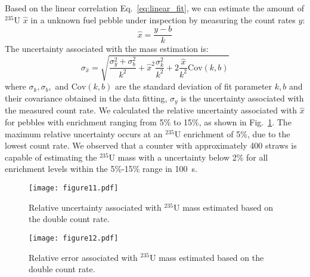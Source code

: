 \documentclass[preprint,final]{elsarticle}
\begin{document}
Based on the linear correlation Eq.~\ref{eq:linear_fit}, we can estimate the amount of $^{235}$U $\hat{x}$ in a unknown fuel pebble under inspection by measuring the  count rates $y$:
\begin{equation}
    \hat{x} = \frac{y-b}{k}
\end{equation}
The uncertainty associated with the mass estimation is:
\begin{equation}
    \sigma_{\hat{x}} = \sqrt{\frac{\sigma_y^2+\sigma_b^2}{k^2}+\hat{x}^2\frac{\sigma_k^2}{k^2}+2\frac{\hat{x}}{k^2}\mathrm{Cov}(k, b)}
\end{equation}
where $\sigma_k, \sigma_b, $ and $\mathrm{Cov}(k, b)$ are the standard deviation of fit parameter $k, b$ and their covariance obtained in the data fitting,  $\sigma_y$ is the uncertainty associated with the measured count rate\cite{difulvio}.
We calculated the relative uncertainty associated with $\hat{x}$ for pebbles with enrichment ranging from 5\% to 15\%, as shown in Fig.~\ref{fig:D_uncerainty}. The maximum relative uncertainty occurs at an ${}^{235}$U enrichment of 5\%, due to the lowest count rate. We observed that a counter with approximately 400 straws is capable of estimating the ${}^{235}$U mass with a uncertainty below 2\% for all enrichment levels within the 5\%-15\% range in \SI{100}{\second}.
\begin{figure}[!htbp]
    \centering
    \texttt{[image: figure11.pdf]}
    \caption{Relative uncertainty associated with $^{235}$U mass estimated based on the double count rate.}
    \label{fig:D_uncerainty}
\end{figure}
\begin{figure}[!htbp]
    \centering
    \texttt{[image: figure12.pdf]}
    \caption{Relative error associated with $^{235}$U mass estimated based on the double count rate.}
    \label{fig:D_error}
\end{figure}
\end{document}
